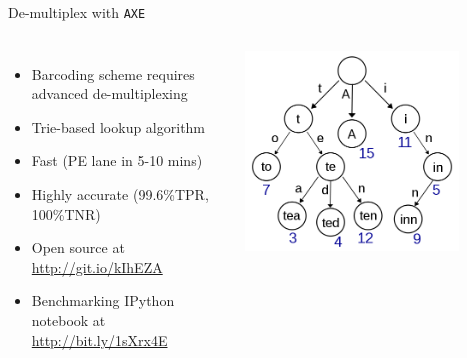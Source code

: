 \documentclass{beamer}
\begin{document}
\begin{frame}{De-multiplex with \texttt{AXE}}
  \begin{columns}[b]
    \begin{itemize}
      \item Barcoding scheme requires advanced de-multiplexing
      \item Trie-based lookup algorithm
      \item Fast (PE lane in 5-10 mins)
      \item Highly accurate (99.6\%TPR, 100\%TNR)
      \item Open source at \url{http://git.io/kIhEZA}
      \item Benchmarking IPython notebook at \url{http://bit.ly/1sXrx4E}
    \end{itemize}
    \includegraphics[width=0.8\textwidth]{img/trie.png}
  \end{columns}
  \vfill
\end{frame}
\end{document}
